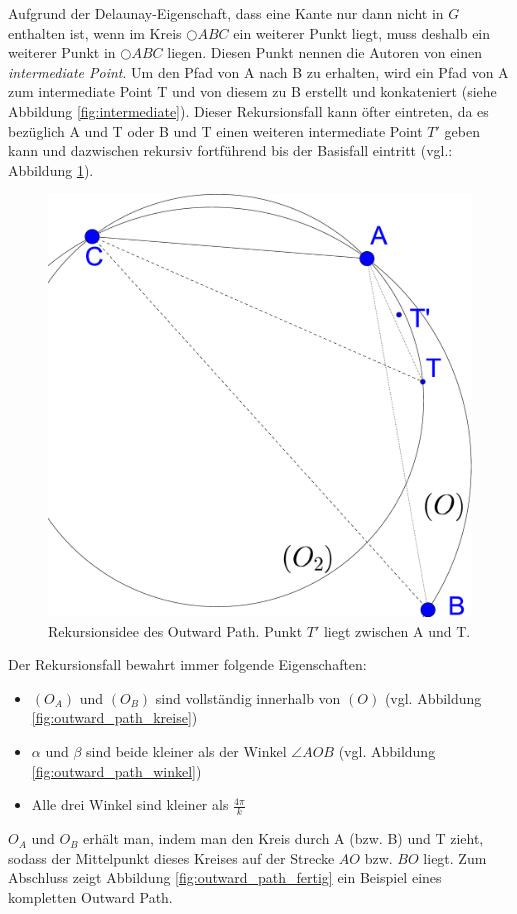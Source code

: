 \documentclass[a4paper,twoside]{IEEEtran}
\begin{document}
Aufgrund der Delaunay-Eigenschaft, dass eine Kante nur dann nicht in $G $ enthalten ist, wenn im Kreis $\bigcirc {ABC} $ ein weiterer Punkt liegt, muss deshalb ein weiterer Punkt in  $\bigcirc {ABC} $ liegen.
Diesen Punkt nennen die Autoren von \cite{kanj} einen \emph{intermediate Point}.
Um den Pfad von A nach B zu erhalten, wird ein Pfad von A zum intermediate Point T und von diesem zu B erstellt und konkateniert (siehe Abbildung \ref{fig:intermediate}).
Dieser Rekursionsfall kann öfter eintreten, da es bezüglich A und T oder B und T einen weiteren intermediate Point $T' $ geben kann und dazwischen rekursiv fortführend bis der Basisfall eintritt (vgl.: Abbildung \ref{fig:rekursion}).
\begin{figure}[h!]
\centering
\includegraphics[width=0.8\linewidth]{rekursion.eps}
\caption{Rekursionsidee des Outward Path. Punkt $T' $ liegt zwischen A und T.}
\label{fig:rekursion}
\end{figure}
Der Rekursionsfall bewahrt immer folgende Eigenschaften:
\begin{itemize}
\item $(O_A) $ und $(O_B) $ sind vollständig innerhalb von $(O) $ (vgl. Abbildung \ref{fig:outward_path_kreise})
\item $\alpha $ und $\beta $ sind beide kleiner als der Winkel $\angle {AOB} $ (vgl. Abbildung \ref{fig:outward_path_winkel}) 
\item Alle drei Winkel sind kleiner als $\frac{4\pi}{k} $
\end{itemize}
$O_A $ und $O_B $ erhält man, indem man den Kreis durch A (bzw. B) und T zieht, sodass der Mittelpunkt dieses Kreises auf der Strecke $AO $ bzw. $BO $ liegt.
Zum Abschluss zeigt Abbildung \ref{fig:outward_path_fertig} ein Beispiel eines kompletten Outward Path.
\end{document}
